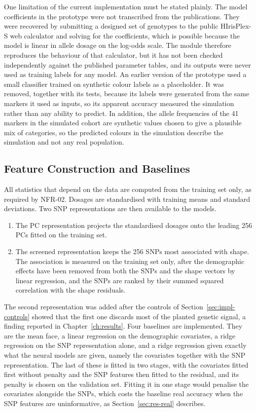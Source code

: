 One limitation of the current implementation must be stated plainly. The model coefficients in the prototype were not transcribed from the publications. They were recovered by submitting a designed set of genotypes to the public HIrisPlex-S web calculator and solving for the coefficients, which is possible because the model is linear in allele dosage on the log-odds scale. The module therefore reproduces the behaviour of that calculator, but it has not been checked independently against the published parameter tables, and its outputs were never used as training labels for any model. An earlier version of the prototype used a small classifier trained on synthetic colour labels as a placeholder. It was removed, together with its tests, because its labels were generated from the same markers it used as inputs, so its apparent accuracy measured the simulation rather than any ability to predict. In addition, the allele frequencies of the 41 markers in the simulated cohort are synthetic values chosen to give a plausible mix of categories, so the predicted colours in the simulation describe the simulation and not any real population.

\subsection{Feature Construction and Baselines}
\label{sec:impl-features}
All statistics that depend on the data are computed from the training set only, as required by NFR-02. Dosages are standardised with training means and standard deviations. Two SNP representations are then available to the models.
\begin{enumerate}
\item The PC representation projects the standardised dosages onto the leading 256 PCs fitted on the training set.
\item The screened representation keeps the 256 SNPs most associated with shape. The association is measured on the training set only, after the demographic effects have been removed from both the SNPs and the shape vectors by linear regression, and the SNPs are ranked by their summed squared correlation with the shape residuals.
\end{enumerate}
The second representation was added after the controls of Section~\ref{sec:impl-controls} showed that the first one discards most of the planted genetic signal, a finding reported in Chapter~\ref{ch:results}. Four baselines are implemented. They are the mean face, a linear regression on the demographic covariates, a ridge regression on the SNP representation alone, and a ridge regression given exactly what the neural models are given, namely the covariates together with the SNP representation. The last of these is fitted in two stages, with the covariates fitted first without penalty and the SNP features then fitted to the residual, and its penalty is chosen on the validation set. Fitting it in one stage would penalise the covariates alongside the SNPs, which costs the baseline real accuracy when the SNP features are uninformative, as Section~\ref{sec:res-real} describes.

